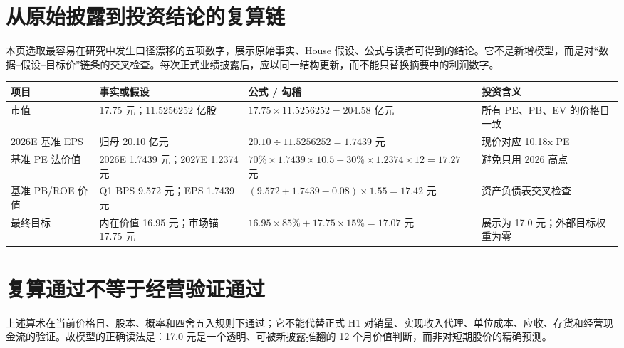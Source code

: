 \section{从原始披露到投资结论的复算链}

本页选取最容易在研究中发生口径漂移的五项数字，展示原始事实、House 假设、公式与读者可得到的结论。它不是新增模型，而是对“数据--假设--目标价”链条的交叉检查。每次正式业绩披露后，应以同一结构更新，而不能只替换摘要中的利润数字。

\begin{exhibitbox}[表 A-11：五项关键数字的复算实例]
\begin{tabularx}{\exhibitboxwidth}{L{2.5cm}L{3.1cm}X X}
\toprule
项目 & 事实或假设 & 公式 / 勾稽 & 投资含义 \\
\midrule
市值 & 17.75 元；11.5256252 亿股 & $17.75\times11.5256252=204.58$ 亿元 & 所有 PE、PB、EV 的价格日一致 \\
2026E 基准 EPS & 归母 20.10 亿元 & $20.10\div11.5256252=1.7439$ 元 & 现价对应 10.18x PE \\
基准 PE 法价值 & 2026E 1.7439 元；2027E 1.2374 元 & $70\%\times1.7439\times10.5+30\%\times1.2374\times12=17.27$ 元 & 避免只用 2026 高点 \\
基准 PB/ROE 价值 & Q1 BPS 9.572 元；EPS 1.7439 元 & $(9.572+1.7439-0.08)\times1.55=17.42$ 元 & 资产负债表交叉检查 \\
最终目标 & 内在价值 16.95 元；市场锚 17.75 元 & $16.95\times85\%+17.75\times15\%=17.07$ 元 & 展示为 17.0 元；外部目标权重为零 \\
\bottomrule
\end{tabularx}
\end{exhibitbox}

\section{复算通过不等于经营验证通过}

上述算术在当前价格日、股本、概率和四舍五入规则下通过；它不能代替正式 H1 对销量、实现收入代理、单位成本、应收、存货和经营现金流的验证。故模型的正确读法是：17.0 元是一个透明、可被新披露推翻的 12 个月价值判断，而非对短期股价的精确预测。

